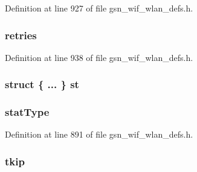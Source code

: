 Definition at line 927 of file gsn\_\-wif\_\-wlan\_\-defs.h.

\hypertarget{a00410_a2c017a9458b7c7101d15c4e05b8d3a11}{
\subsubsection[{retries}]{ {\bf retries}}}
\label{a00410_a2c017a9458b7c7101d15c4e05b8d3a11}


Definition at line 938 of file gsn\_\-wif\_\-wlan\_\-defs.h.

\hypertarget{a00410_a8f3bdd08f5f6770671203303462c8200}{
\subsubsection[{st}]{\setlength{\rightskip}{0pt plus 5cm}struct \{ ... \}   {\bf st}}}
\label{a00410_a8f3bdd08f5f6770671203303462c8200}
\hypertarget{a00410_a1368e1d98f8be9ce5103d4d75a56588a}{
\subsubsection[{statType}]{ {\bf statType}}}
\label{a00410_a1368e1d98f8be9ce5103d4d75a56588a}


Definition at line 891 of file gsn\_\-wif\_\-wlan\_\-defs.h.

\hypertarget{a00410_a098ddf70ebfebfbb42a1fcc820eb66a8}{
\subsubsection[{tkip}]{ {\bf tkip}}}
\label{a00410_a098ddf70ebfebfbb42a1fcc820eb66a8}


